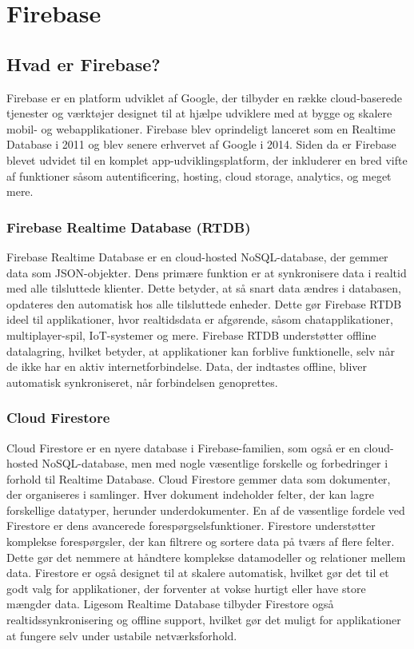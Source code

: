 
\chapter{Firebase}
\section{Hvad er Firebase?}
Firebase er en platform udviklet af Google, der tilbyder en række cloud-baserede tjenester og værktøjer designet til at hjælpe udviklere med at bygge og skalere mobil- og webapplikationer. Firebase blev oprindeligt lanceret som en Realtime Database i 2011 og blev senere erhvervet af Google i 2014. Siden da er Firebase blevet udvidet til en komplet app-udviklingsplatform, der inkluderer en bred vifte af funktioner såsom autentificering, hosting, cloud storage, analytics, og meget mere.

\subsection*{Firebase Realtime Database (RTDB)}
Firebase Realtime Database er en cloud-hosted NoSQL-database, der gemmer data som JSON-objekter. Dens primære funktion er at synkronisere data i realtid med alle tilsluttede klienter. Dette betyder, at så snart data ændres i databasen, opdateres den automatisk hos alle tilsluttede enheder. Dette gør Firebase RTDB ideel til applikationer, hvor realtidsdata er afgørende, såsom chatapplikationer, multiplayer-spil, IoT-systemer og mere.
\newline\newline\noindent
Firebase RTDB understøtter offline datalagring, hvilket betyder, at applikationer kan forblive funktionelle, selv når de ikke har en aktiv internetforbindelse. Data, der indtastes offline, bliver automatisk synkroniseret, når forbindelsen genoprettes. 

\subsection*{Cloud Firestore}
Cloud Firestore er en nyere database i Firebase-familien, som også er en cloud-hosted NoSQL-database, men med nogle væsentlige forskelle og forbedringer i forhold til Realtime Database. Cloud Firestore gemmer data som dokumenter, der organiseres i samlinger. Hver dokument indeholder felter, der kan lagre forskellige datatyper, herunder underdokumenter.
\newline\newline\noindent
En af de væsentlige fordele ved Firestore er dens avancerede forespørgselsfunktioner. Firestore understøtter komplekse forespørgsler, der kan filtrere og sortere data på tværs af flere felter. Dette gør det nemmere at håndtere komplekse datamodeller og relationer mellem data.
\newline\newline\noindent
Firestore er også designet til at skalere automatisk, hvilket gør det til et godt valg for applikationer, der forventer at vokse hurtigt eller have store mængder data. Ligesom Realtime Database tilbyder Firestore også realtidssynkronisering og offline support, hvilket gør det muligt for applikationer at fungere selv under ustabile netværksforhold.

